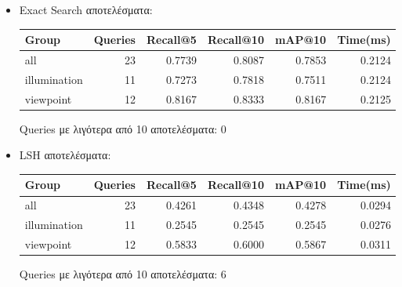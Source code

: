 \documentclass [conference]{IEEEtran}
\begin{document}
\begin{itemize}

    \item Exact Search αποτελέσματα:
    \begin{table}[H]
    \centering
    \small
    \setlength{\tabcolsep}{3pt}
    \begin{tabular}{l r r r r r}
    \hline
    \textbf{Group} & \textbf{Queries} & \textbf{Recall@5} & \textbf{Recall@10} & \textbf{mAP@10} & \textbf{Time(ms)} \\
    \hline
    all & 23 & 0.7739 & 0.8087 & 0.7853 & 0.2124 \\
    illumination & 11 & 0.7273 & 0.7818 & 0.7511 & 0.2124 \\
    viewpoint & 12 & 0.8167 & 0.8333 & 0.8167 & 0.2125 \\
    \hline
    \end{tabular}
    \par\smallskip
    \footnotesize Queries με λιγότερα από 10 αποτελέσματα: 0
    \end{table}
    

    \item LSH αποτελέσματα:
    \begin{table}[H]
    \centering
    \small
    \setlength{\tabcolsep}{3pt}
    \begin{tabular}{l r r r r r}
    \hline
    \textbf{Group} & \textbf{Queries} & \textbf{Recall@5} & \textbf{Recall@10} & \textbf{mAP@10} & \textbf{Time(ms)} \\
    \hline
    all & 23 & 0.4261 & 0.4348 & 0.4278 & 0.0294 \\
    illumination & 11 & 0.2545 & 0.2545 & 0.2545 & 0.0276 \\
    viewpoint & 12 & 0.5833 & 0.6000 & 0.5867 & 0.0311 \\
    \hline
    \end{tabular}
    \par\smallskip
    \footnotesize Queries με λιγότερα από 10 αποτελέσματα: 6
    \end{table}



\end{itemize}
\end{document}
